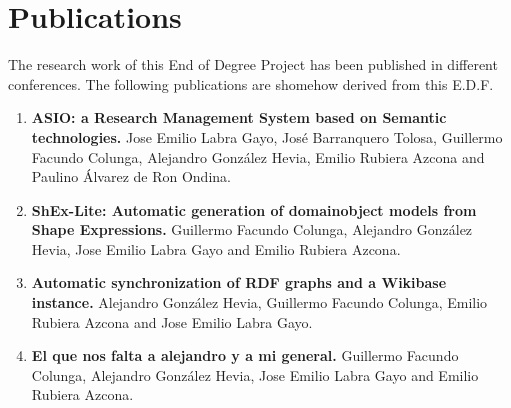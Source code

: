 \chapter{Publications}

The research work of this End of Degree Project has been published in different conferences.
The following publications are shomehow derived from this E.D.F.

\begin{enumerate}
    \item \textbf{ASIO: a Research Management System based on Semantic technologies.} Jose Emilio Labra Gayo,
    José Barranquero Tolosa, Guillermo Facundo Colunga, Alejandro González Hevia, Emilio Rubiera Azcona and
    Paulino Álvarez de Ron Ondina.
    \item \textbf{ShEx-Lite: Automatic generation of domainobject models from Shape Expressions.} Guillermo Facundo Colunga,
    Alejandro González Hevia, Jose Emilio Labra Gayo and Emilio Rubiera Azcona.
    \item \textbf{Automatic synchronization of RDF graphs and a Wikibase instance.} Alejandro González Hevia,
    Guillermo Facundo Colunga, Emilio Rubiera Azcona and Jose Emilio Labra Gayo.
    \item \textbf{El que nos falta a alejandro y a mi general.} Guillermo Facundo Colunga,
    Alejandro González Hevia, Jose Emilio Labra Gayo and Emilio Rubiera Azcona.
\end{enumerate}
